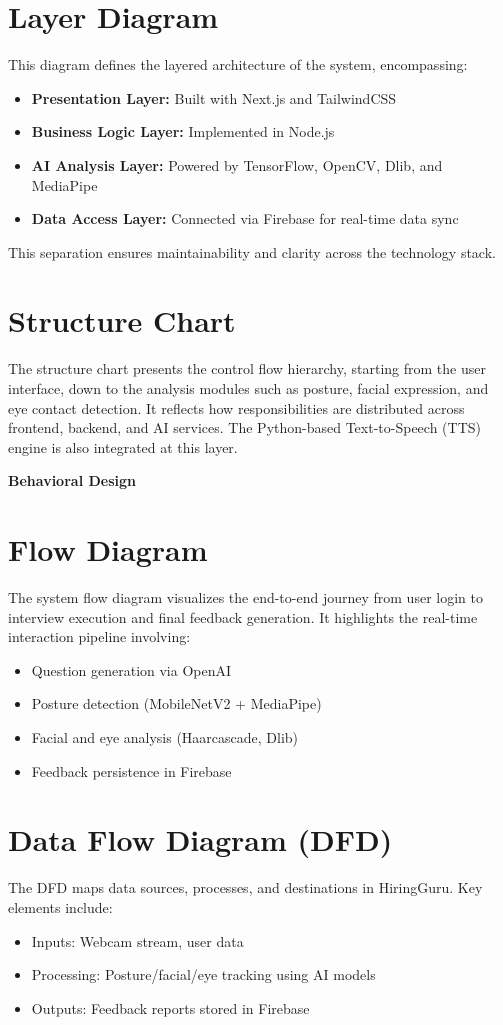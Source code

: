 \section{Layer Diagram}
This diagram defines the layered architecture of the system, encompassing:
\begin{itemize}
    \item \textbf{Presentation Layer:} Built with Next.js and TailwindCSS
    \item \textbf{Business Logic Layer:} Implemented in Node.js
    \item \textbf{AI Analysis Layer:} Powered by TensorFlow, OpenCV, Dlib, and MediaPipe
    \item \textbf{Data Access Layer:} Connected via Firebase for real-time data sync
\end{itemize}
This separation ensures maintainability and clarity across the technology stack.

\section{Structure Chart}
The structure chart presents the control flow hierarchy, starting from the user interface, down to the analysis modules such as posture, facial expression, and eye contact detection. It reflects how responsibilities are distributed across frontend, backend, and AI services. The Python-based Text-to-Speech (TTS) engine is also integrated at this layer.

\textbf{Behavioral Design}

\section{Flow Diagram}
The system flow diagram visualizes the end-to-end journey from user login to interview execution and final feedback generation. It highlights the real-time interaction pipeline involving:
\begin{itemize}
    \item Question generation via OpenAI
    \item Posture detection (MobileNetV2 + MediaPipe)
    \item Facial and eye analysis (Haarcascade, Dlib)
    \item Feedback persistence in Firebase
\end{itemize}

\section{Data Flow Diagram (DFD)}
The DFD maps data sources, processes, and destinations in HiringGuru. Key elements include:
\begin{itemize}
    \item Inputs: Webcam stream, user data
    \item Processing: Posture/facial/eye tracking using AI models
    \item Outputs: Feedback reports stored in Firebase
\end{itemize}

